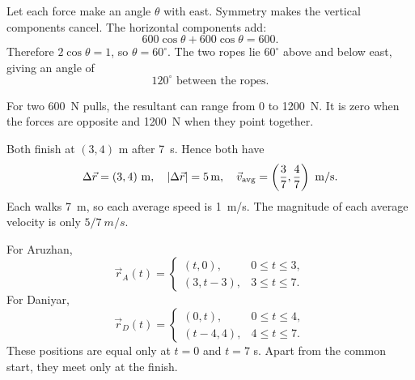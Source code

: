 \documentclass[11pt,a4paper]{article}
\begin{document}


Let each force make an angle $\theta$ with east. Symmetry makes the vertical components cancel. The horizontal components add:
\[ 
  600\cos\theta+600\cos\theta=600. 
\]
Therefore $2\cos\theta=1$, so $\theta=60^\circ$. The two ropes lie $60^\circ$ above and below east, giving an angle of
\[
  \boxed{120^\circ\text{ between the ropes}.} 
\]

\begin{center}
\end{center}

For two \SI{600}{N} pulls, the resultant can range from $0$ to \SI{1200}{N}. It is zero when the forces are opposite and \SI{1200}{N} when they point together.



\vfill

\clearpage
{}

Both finish at $(3,4)$ m after \SI{7}{s}. Hence both have
\[
\Delta\vec r=(3,4)\ \si{m},\quad |\Delta\vec r|=\SI{5}{m},\quad
\vec v_{\rm avg}=\left(\frac37,\frac47\right)\ \si{m/s}.
\]
Each walks \SI{7}{m}, so each average speed is \SI{1}{m/s}. The magnitude of each average velocity is only $5/7\ \si{m/s}$.

For Aruzhan,
\[
\vec r_A(t)=
\begin{cases}
(t,0),&0\le t\le3,\\
(3,t-3),&3\le t\le7.
\end{cases}
\]
For Daniyar,
\[
\vec r_D(t)=
\begin{cases}
(0,t),&0\le t\le4,\\
(t-4,4),&4\le t\le7.
\end{cases}
\]
These positions are equal only at $t=0$ and $t=7$ s. Apart from the common start, they meet only at the finish.
\end{document}
